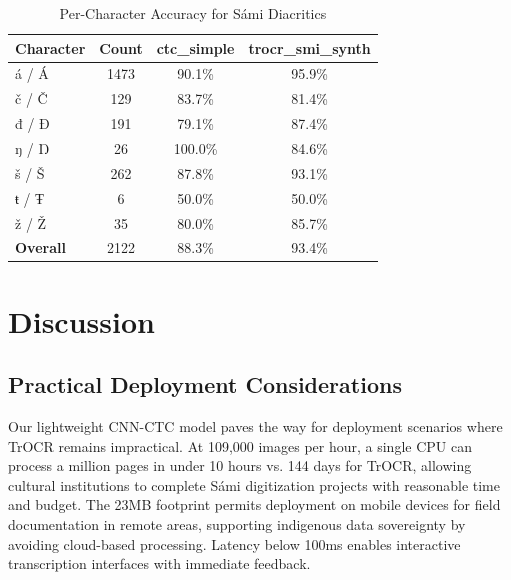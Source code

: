 \documentclass[conference]{IEEEtran}
\newcommand{\ctcSize}{23}
\newcommand{\ctcThroughputK}{109}  %
\newcommand{\millionPagesCtcHours}{10}  %
\newcommand{\millionPagesTrocrDays}{144}  %
\begin{document}
\begin{table}[h]
    \centering
    \caption{\footnotesize Per-Character Accuracy for S\'{a}mi Diacritics}
    \label{tab:diacritics}
    \small
    \begin{tabular}{@{}lccc@{}}
    \toprule
    \textbf{Character} & \textbf{Count} & \textbf{ctc\_simple} & \textbf{trocr\_smi\_synth} \\
    \midrule
    \'{a} / \'{A} & 1473 & 90.1\% & 95.9\% \\
    \v{c} / \v{C} & 129 & 83.7\% & 81.4\% \\
    đ / Đ & 191 & 79.1\% & 87.4\% \\
    ŋ / Ŋ & 26 & 100.0\% & 84.6\% \\
    \v{s} / \v{S} & 262 & 87.8\% & 93.1\% \\
    ŧ / Ŧ & 6 & 50.0\% & 50.0\% \\
    \v{z} / \v{Z} & 35 & 80.0\% & 85.7\% \\
    \midrule
    \textbf{Overall} & 2122 & 88.3\% & 93.4\% \\
    \bottomrule
    \end{tabular}
\end{table}


\section{Discussion}
\label{sec:discussion}

\subsection{Practical Deployment Considerations}
\label{subsec:deployment}

Our lightweight CNN-CTC model paves the way for deployment scenarios where TrOCR remains impractical. At \ctcThroughputK{},000 images per hour, a single CPU can process a million pages in under \millionPagesCtcHours{} hours vs. \millionPagesTrocrDays{} days for TrOCR, allowing cultural institutions to complete S\'{a}mi digitization projects with reasonable time and budget. The \ctcSize{}MB footprint permits deployment on mobile devices for field documentation in remote areas, supporting indigenous data sovereignty by avoiding cloud-based processing. Latency below 100ms enables interactive transcription interfaces with immediate feedback.
\end{document}
